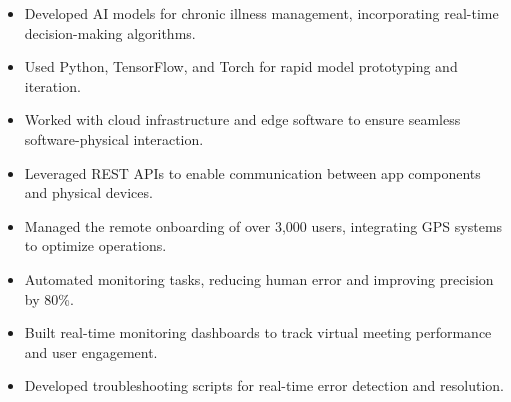 \par\smallskip
\noindent
\begin{minipage}{20cm}
  \begin{minipage}{9.75cm}
    \begin{itemize}
      \item Developed AI models for chronic illness management, incorporating real-time decision-making algorithms.
      \item Used Python, TensorFlow, and Torch for rapid model prototyping and iteration.
    \end{itemize}
  \end{minipage}
  \hfill
  \begin{minipage}{9.75cm}
    \begin{itemize}
      \item Worked with cloud infrastructure and edge software to ensure seamless software-physical interaction.
      \item Leveraged REST APIs to enable communication between app components and physical devices.
    \end{itemize}
  \end{minipage}
\end{minipage}
\par\smallskip
\divider

\par\smallskip
\noindent
\begin{minipage}{20cm}
  \begin{minipage}{9.75cm}
    \begin{itemize}
      \item Managed the remote onboarding of over 3,000 users, integrating GPS systems to optimize operations.
      \item Automated monitoring tasks, reducing human error and improving precision by 80\%.
    \end{itemize}
  \end{minipage}
  \hfill
  \begin{minipage}{9.75cm}
    \begin{itemize}
      \item Built real-time monitoring dashboards to track virtual meeting performance and user engagement.
      \item Developed troubleshooting scripts for real-time error detection and resolution.
    \end{itemize}
  \end{minipage}
\end{minipage}

